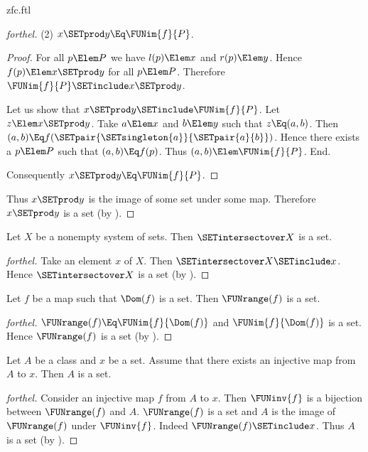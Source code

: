 \documentclass{stex}
\begin{document}
\begin{smodule}{zfc.ftl}
\begin{proof}[forthel]
  (2) $x \SETprod y \Eq \FUNim{f}{P}$.
  \begin{proof}
    For all $p \Elem P$ we have $l(p) \Elem x$ and $r(p) \Elem y$.
    Hence $f(p) \Elem x \SETprod y$ for all $p \Elem P$.
    Therefore $\FUNim{f}{P} \SETinclude x \SETprod y$.

    Let us show that $x \SETprod y \SETinclude \FUNim{f}{P}$.
      Let $z \Elem x \SETprod y$.
      Take $a \Elem x$ and $b \Elem y$ such that $z \Eq (a,b)$.
      Then $(a,b) \Eq f(\SETpair{\SETsingleton{a}}{\SETpair{a}{b}})$.
      Hence there exists a $p \Elem P$ such that $(a,b) \Eq f(p)$.
      Thus $(a,b) \Elem \FUNim{f}{P}$.
    End.

    Consequently $x \SETprod y \Eq \FUNim{f}{P}$.
  \end{proof}

  Thus $x \SETprod y$ is the image of some set under some map.
  Therefore $x \SETprod y$ is a set (by ).
\end{proof}

\begin{proposition}[forthel]
  Let $X$ be a nonempty system of sets.
  Then $\SETintersectover X$ is a set.
\end{proposition}
\begin{proof}[forthel]
  Take an element $x$ of $X$.
  Then $\SETintersectover X \SETinclude x$.
  Hence $\SETintersectover X$ is a set (by ).
\end{proof}

\begin{proposition}[forthel]
  Let $f$ be a map such that $\Dom(f)$ is a set.
  Then $\FUNrange(f)$ is a set.
\end{proposition}
\begin{proof}[forthel]
  $\FUNrange(f) \Eq \FUNim{f}{\Dom(f)}$ and $\FUNim{f}{\Dom(f)}$ is a set.
  Hence $\FUNrange(f)$ is a set (by ).
\end{proof}

\begin{proposition}[forthel]
  Let $A$ be a class and $x$ be a set.
  Assume that there exists an injective map from $A$ to $x$.
  Then $A$ is a set.
\end{proposition}
\begin{proof}[forthel]
  Consider an injective map $f$ from $A$ to $x$.
  Then $\FUNinv{f}$ is a bijection between $\FUNrange(f)$ and $A$.
  $\FUNrange(f)$ is a set and $A$ is the image of $\FUNrange(f)$ under $\FUNinv{f}$.
  Indeed $\FUNrange(f) \SETinclude x$.
  Thus $A$ is a set (by ).
\end{proof}


\end{smodule}
\end{document}
